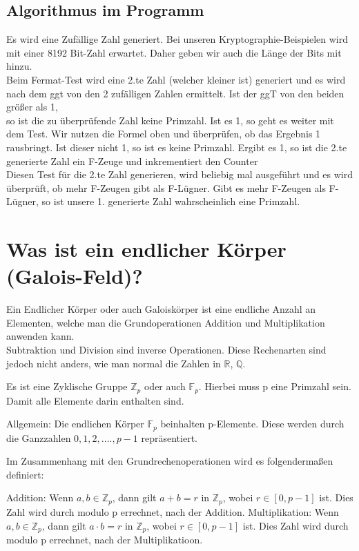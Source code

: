 \subsection*{Algorithmus im Programm}
Es wird eine Zufällige Zahl generiert. Bei unseren Kryptographie-Beispielen wird mit einer 8192 Bit-Zahl erwartet. Daher geben wir auch die Länge der Bits mit hinzu.\\
Beim Fermat-Test wird eine 2.te Zahl (welcher kleiner ist) generiert und es wird nach dem ggt von den 2 zufälligen Zahlen ermittelt. Ist der ggT von den beiden größer als 1,\\
so ist die zu überprüfende Zahl keine Primzahl. Ist es 1, so geht es weiter mit dem Test. Wir nutzen die Formel oben und überprüfen, ob das Ergebnis 1 rausbringt. Ist dieser nicht 1, so ist es keine Primzahl. Ergibt es 1, so ist die 2.te generierte Zahl ein F-Zeuge und inkrementiert den Counter\\
Diesen Test für die 2.te Zahl generieren, wird beliebig mal ausgeführt und es wird überprüft, ob mehr F-Zeugen gibt als F-Lügner. Gibt es mehr F-Zeugen als F-Lügner, so ist unsere 1. generierte Zahl wahrscheinlich eine Primzahl.


\newpage
\section{Was ist ein endlicher Körper (Galois-Feld)?}

Ein Endlicher Körper oder auch Galoiskörper ist eine endliche Anzahl an Elementen, welche man die Grundoperationen Addition und Multiplikation anwenden kann.\\

Subtraktion und Division sind inverse Operationen. Diese Rechenarten sind jedoch nicht anders, wie man normal die Zahlen in $\mathbb{R}$, $\mathbb{Q}$.

Es ist eine Zyklische Gruppe $ \mathbb{Z}_p $ oder auch $ \mathbb{F}_p $. Hierbei muss p eine Primzahl sein. Damit alle Elemente darin enthalten sind. 

Allgemein: Die endlichen Körper $\mathbb{F}_p$ beinhalten p-Elemente. Diese werden durch die Ganzzahlen ${0,1,2,....,p-1}$ repräsentiert. 

Im Zusammenhang mit den Grundrechenoperationen wird es folgendermaßen definiert:

Addition: Wenn $ a, b \in \mathbb{Z}_p $, dann gilt $ a+b =r$ in $ \mathbb{Z}_p $, wobei $r \in [0, p-1]$ ist. Dies Zahl wird durch modulo p errechnet, nach der Addition.
Multiplikation: Wenn $ a, b \in \mathbb{Z}_p $, dann gilt $ a \cdot b =r$ in $ \mathbb{Z}_p $, wobei $r \in [0, p-1]$ ist. Dies Zahl wird durch modulo p errechnet, nach der Multiplikatioon.

